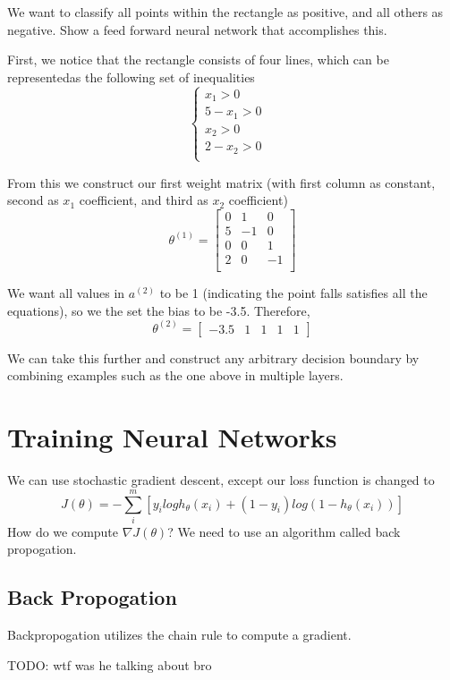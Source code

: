 \begin{example}
    \begin{center}
    \end{center}

    We want to classify all points within the rectangle as positive, and all others as negative. Show a feed forward neural network that accomplishes this. 

    First, we notice that the rectangle consists of four lines, which can be representedas the following set of inequalities
    \begin{equation*}
        \begin{cases}
            x_1 > 0 & \\
            5 - x_1 > 0 & \\
            x_2 > 0 & \\
            2 - x_2 > 0 & \\
        \end{cases}
    \end{equation*}

    From this we construct our first weight matrix (with first column as constant, second as $x_1$ coefficient, and third as $x_2$ coefficient)
    \[ \theta^{(1)} = \begin{bmatrix}
        0 & 1 & 0 \\
        5 & -1 & 0 \\
        0 & 0 & 1 \\
        2 & 0 & -1 \\
    \end{bmatrix} 
    \]

    We want all values in $a^{(2)}$ to be 1 (indicating the point falls satisfies all the equations), so we the set the bias to be -3.5. Therefore,
    \[
        \theta^{(2)} = \begin{bmatrix}
            -3.5 & 1 & 1 & 1 & 1
        \end{bmatrix}
    \]

    We can take this further and construct any arbitrary decision boundary by combining examples such as the one above in multiple layers. 
\end{example}

\section{Training Neural Networks}
We can use stochastic gradient descent, except our loss function is changed to 
\[
    J(\theta)   = -\sum_i^m[y_ilogh_\theta(x_i) + (1-y_i)log(1-h_\theta(x_i))]
\]
How do we compute $\nabla J(\theta)$? We need to use an algorithm called back propogation.

\subsection*{Back Propogation}
Backpropogation utilizes the chain rule to compute a gradient.

TODO: wtf was he talking about bro